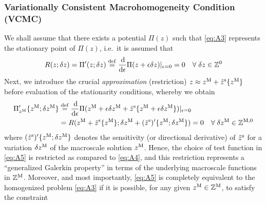 \documentclass{bmcart}
\newcommand{\eqtref}[1]{\eqref{#1}}
\begin{document}
\subsubsection{Variationally Consistent Macrohomogeneity Condition (VCMC)}

We shall assume that there exists a potential $\Pi(z)$ such that \eqtref{eq:A3} represents the stationary point of $\Pi(z)$, i.e.\ it is assumed that
\begin{align}
\label{eq:A4} R(z;\delta z) = \Pi'(z;\delta z) \defeq \frac{\dif}{\dif\epsilon}\Pi(z+\epsilon\delta z)|_{\epsilon = 0} = 0\quad \forall\;\delta z \in \set Z^0
\end{align}
Next, we introduce the crucial \emph{approximation} (restriction) $z \approx z^{\mathrm{M}} + \tilde{z}^{\mathrm{s}}\{z^{\mathrm{M}}\}$ before evaluation of the stationarity conditions, whereby we obtain
\begin{align}
\label{eq:A5} \Pi_{z^\macro}'\{z^\macro;\delta z^\macro\} & \defeq
\frac{\dif}{\dif\epsilon}\Pi(z^\macro+\epsilon \delta z^\macro+\tilde{z}^\fluct\{z^\macro+\epsilon \delta z^\macro\})|_{\epsilon = 0} \nonumber \\
& =
R(z^\macro + \tilde{z}^\fluct\{z^\macro\}; \delta z^\macro + (\tilde{z}^\fluct)'\{z^\macro;\delta z^\macro\}) = 0\quad \forall\;\delta z^\macro\in\set Z^{\macro,0}
\end{align}
where $(\tilde{z}^{\mathrm{s}})'\{z^{\mathrm{M}};\delta z^{\mathrm{M}}\}$ denotes the sensitivity (or directional derivative) of $\tilde z^{\mathrm{s}}$ for a variation $\delta z^{\mathrm{M}}$ of the macroscale solution $z^{\mathrm{M}}$.
Hence, the choice of test function in \eqtref{eq:A5} is restricted as compared to \eqtref{eq:A4}, and this restriction represents a ``generalized Galerkin property'' in terms of the underlying macroscale functions in $\mathbb{Z}^{\mathrm{M}}$.
Moreover, and most importantly, \eqtref{eq:A5} is completely equivalent to the homogenized problem \eqtref{eq:A3} if it is possible, for any given $z^{\mathrm{M}}\in\mathbb{Z}^{\mathrm{M}}$, to satisfy the constraint
\end{document}
